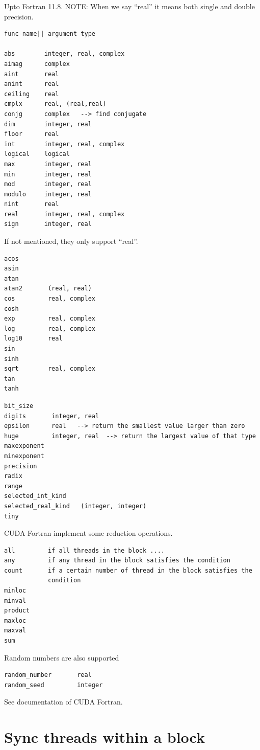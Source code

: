 Upto Fortran 11.8. NOTE: When we say ``real'' it means both single and
double precision. 
\begin{verbatim}
func-name|| argument type

abs        integer, real, complex
aimag      complex
aint       real
anint      real
ceiling    real
cmplx      real, (real,real)
conjg      complex   --> find conjugate
dim        integer, real
floor      real
int        integer, real, complex
logical    logical
max        integer, real
min        integer, real
mod        integer, real
modulo     integer, real
nint       real
real       integer, real, complex
sign       integer, real
\end{verbatim}

If not mentioned, they only support ``real''.
\begin{verbatim}
acos
asin
atan
atan2       (real, real)
cos         real, complex
cosh
exp         real, complex
log         real, complex
log10       real
sin
sinh
sqrt        real, complex
tan
tanh
\end{verbatim}



\begin{verbatim}
bit_size
digits       integer, real
epsilon      real   --> return the smallest value larger than zero
huge         integer, real  --> return the largest value of that type
maxexponent
minexponent
precision
radix
range
selected_int_kind
selected_real_kind   (integer, integer)
tiny
\end{verbatim}


CUDA Fortran implement some reduction operations. 
\begin{verbatim}
all         if all threads in the block ....
any         if any thread in the block satisfies the condition
count       if a certain number of thread in the block satisfies the
            condition 
minloc
minval
product
maxloc
maxval
sum
\end{verbatim}

Random numbers are also supported
\begin{verbatim}
random_number       real
random_seed         integer
\end{verbatim}

See documentation of CUDA Fortran.

\section{Sync threads within a block}
\label{sec:synthreads-block}

